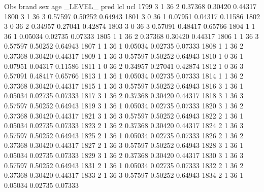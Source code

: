 \documentclass{article}
\begin{document}
\begin{Woutput}
 Obs    brand    sex    age    _LEVEL_      pred       lcl        ucl
1799      3       1      36       2       0.37368    0.30420    0.44317
1800      3       1      36       3       0.57597    0.50252    0.64943
1801      3       0      36       1       0.07951    0.04317    0.11586
1802      3       0      36       2       0.34957    0.27041    0.42874
1803      3       0      36       3       0.57091    0.48417    0.65766
1804      1       1      36       1       0.05034    0.02735    0.07333
1805      1       1      36       2       0.37368    0.30420    0.44317
1806      1       1      36       3       0.57597    0.50252    0.64943
1807      1       1      36       1       0.05034    0.02735    0.07333
1808      1       1      36       2       0.37368    0.30420    0.44317
1809      1       1      36       3       0.57597    0.50252    0.64943
1810      1       0      36       1       0.07951    0.04317    0.11586
1811      1       0      36       2       0.34957    0.27041    0.42874
1812      1       0      36       3       0.57091    0.48417    0.65766
1813      1       1      36       1       0.05034    0.02735    0.07333
1814      1       1      36       2       0.37368    0.30420    0.44317
1815      1       1      36       3       0.57597    0.50252    0.64943
1816      3       1      36       1       0.05034    0.02735    0.07333
1817      3       1      36       2       0.37368    0.30420    0.44317
1818      3       1      36       3       0.57597    0.50252    0.64943
1819      3       1      36       1       0.05034    0.02735    0.07333
1820      3       1      36       2       0.37368    0.30420    0.44317
1821      3       1      36       3       0.57597    0.50252    0.64943
1822      2       1      36       1       0.05034    0.02735    0.07333
1823      2       1      36       2       0.37368    0.30420    0.44317
1824      2       1      36       3       0.57597    0.50252    0.64943
1825      2       1      36       1       0.05034    0.02735    0.07333
1826      2       1      36       2       0.37368    0.30420    0.44317
1827      2       1      36       3       0.57597    0.50252    0.64943
1828      3       1      36       1       0.05034    0.02735    0.07333
1829      3       1      36       2       0.37368    0.30420    0.44317
1830      3       1      36       3       0.57597    0.50252    0.64943
1831      2       1      36       1       0.05034    0.02735    0.07333
1832      2       1      36       2       0.37368    0.30420    0.44317
1833      2       1      36       3       0.57597    0.50252    0.64943
1834      2       1      36       1       0.05034    0.02735    0.07333

\end{Woutput}
\end{document}
